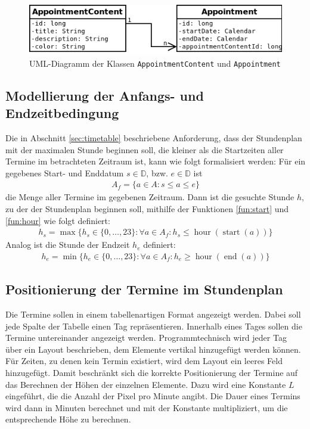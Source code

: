 \documentclass[noindent]{tudreport}
\DeclareMathOperator{\start}{start}
\DeclareMathOperator{\getEnd}{end}
\DeclareMathOperator{\hour}{hour}
\begin{document}
			\begin{figure}[h]
				\centering
				\includegraphics[scale=0.5]{img/uml_appointment.png}
				\caption{UML-Diagramm der Klassen \lstinline!AppointmentContent! und \lstinline!Appointment!}
				\label{fig:uml_appointment}
			\end{figure}
			
			\subsection{Modellierung der Anfangs- und Endzeitbedingung}
				Die in Abschnitt \ref{sec:timetable} beschriebene Anforderung, dass der Stundenplan mit der maximalen Stunde beginnen soll, die kleiner als die Startzeiten aller Termine im betrachteten Zeitraum ist, kann wie folgt formalisiert werden: Für ein gegebenes Start- und Enddatum $s \in \mathbb{D}$, bzw. $e \in \mathbb{D}$ ist
				\begin{align}
A_f = \{a \in A: s \leq a \leq e\}
				\end{align}
				die Menge aller Termine im gegebenen Zeitraum. Dann ist die gesuchte Stunde $h$, zu der der Stundenplan beginnen soll, mithilfe der Funktionen \ref{fun:start} und \ref{fun:hour} wie folgt definiert:
				\begin{align}
h_s = \max\{h_s \in \{0, \dots, 23\}: \forall a \in A_f: h_s \leq \hour(\start(a)) \}
				\end{align}
				Analog ist die Stunde der Endzeit $h_e$ definiert:
				\begin{align}
h_e = \min\{h_e \in \{0, \dots, 23\}: \forall a \in A_f: h_e \geq \hour(\getEnd(a)) \}
				\end{align}
			
			\subsection{Positionierung der Termine im Stundenplan}
				Die Termine sollen in einem tabellenartigen Format angezeigt werden. Dabei soll jede Spalte der Tabelle einen Tag repräsentieren. Innerhalb eines Tages sollen die Termine untereinander angezeigt werden. Programmtechnisch wird jeder Tag über ein Layout beschrieben, dem Elemente vertikal hinzugefügt werden können. Für Zeiten, zu denen kein Termin existiert, wird dem Layout ein leeres Feld hinzugefügt. Damit beschränkt sich die korrekte Positionierung der Termine auf das Berechnen der Höhen der einzelnen Elemente. Dazu wird eine Konstante $L$ eingeführt, die die Anzahl der Pixel pro Minute angibt. Die Dauer eines Termins wird dann in Minuten berechnet und mit der Konstante multipliziert, um die entsprechende Höhe zu berechnen.
	
\end{document}
